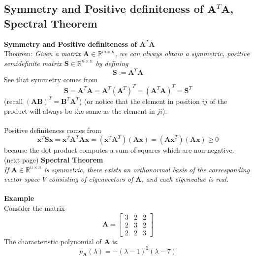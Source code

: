 \documentclass{report}
\begin{document}
\subsection{Symmetry and Positive definiteness of $\bm{A}^T\bm{A}$,\\Spectral Theorem} %
\textbf{Symmetry and Positive definiteness of $\bm{A}^T\bm{A}$}\\
Theorem: \textit{Given a matrix $\bm{A}\in\mathbb{R}^{m\times n}$, we can always obtain a symmetric,
positive semidefinite matrix $\bm{S}\in\mathbb{R}^{n\times n}$ by defining}
\begin{equation*}
\bm{S}:=\bm{A}^T\bm{A}
\end{equation*}
See that symmetry comes from 
\begin{equation*}
\bm{S}=\bm{A}^T\bm{A}=\bm{A}^T(\bm{A}^T)^T=(\bm{A}^T\bm{A})^T=\bm{S}^T
\end{equation*}
(recall $(\bm{AB})^T=\bm{B}^T\bm{A}^T$)
(or notice that the element in position $ij$ of the product will always be the same 
as the element in $ji$).\\
\vspace{1mm}\\
Positive definiteness comes from 
\begin{equation*}
\bm{x}^T\bm{Sx}=
\bm{x}^T\bm{A}^T\bm{Ax}=(\bm{x}^T\bm{A}^T)(\bm{Ax})=(\bm{Ax}^T)(\bm{Ax})\geq0
\end{equation*}
because the dot product computes a sum of squares which are non-negative.\\
(next page)
\newpage
\noindent\textbf{Spectral Theorem}\\
\textit{If $\bm{A}\in\mathbb{R}^{n\times n}$ is symmetric, there exists an orthonormal basis of the corresponding 
vector space $V$ consisting of eigenvectors of $\bm{A}$, and each eigenvalue is real.}\\
\vspace{1mm}\\
\textbf{Example}\\
Consider the matrix
\begin{equation*}
\bm{A}=\begin{bmatrix}3&2&2\\2&3&2\\2&2&3\end{bmatrix}
\end{equation*}
The characteristic polynomial of $\bm{A}$ is
\begin{equation*}
p_{\bm{A}}(\lambda)=-(\lambda-1)^2(\lambda-7)
\end{equation*}
\end{document}
